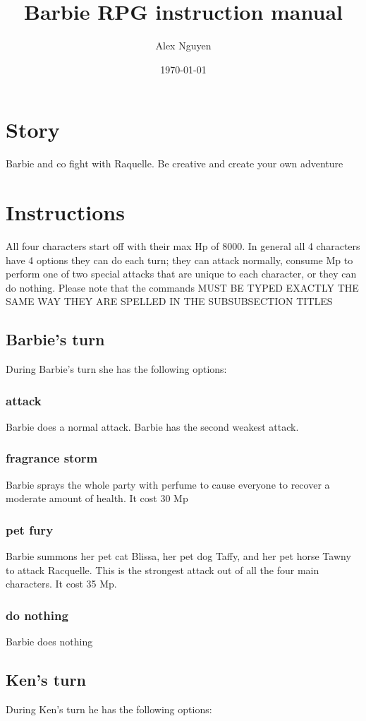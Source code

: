 \documentclass[a4paper]{article}
\title{Barbie RPG instruction manual}
\author{Alex Nguyen}
\date{\today}
\begin{document}
\maketitle

\section{Story}
Barbie and co fight with Raquelle. Be creative and create your own adventure
\section{Instructions}
All four characters start off with their max Hp of 8000. In general all 4 characters have 4 options they can do each turn; they can attack normally, consume Mp to perform one of two special attacks that are unique to each character, or they can do nothing. Please note that the commands MUST BE TYPED EXACTLY THE SAME WAY THEY ARE SPELLED IN THE SUBSUBSECTION TITLES
\subsection{Barbie's turn}
During Barbie's turn she has the following options:
\subsubsection{attack}
Barbie does a normal attack. Barbie has the second weakest attack.
\subsubsection{fragrance storm}
Barbie sprays the whole party with perfume to cause everyone to recover a moderate amount of health. It cost 30 Mp
\subsubsection{pet fury}
Barbie summons her pet cat Blissa, her pet dog Taffy, and her pet horse Tawny to attack Racquelle. This is the strongest attack out of all the four main characters. It cost 35 Mp.
\subsubsection{do nothing}
Barbie does nothing
\subsection{Ken's turn}
During Ken's turn he has the following options:
\end{document}
